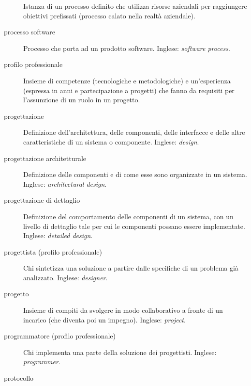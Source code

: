 \documentclass[a4paper]{article}
\begin{document}
\begin{description}
			Istanza di un processo definito che utilizza risorse aziendali per raggiungere obiettivi prefissati (processo calato nella realtà aziendale).
			
	\item[processo software] 

			Processo che porta ad un prodotto software. Inglese: \emph{software process}.
			
	\item[profilo professionale] 

			Insieme di competenze (tecnologiche e metodologiche) e un'esperienza (espressa in anni e partecipazione a progetti) che fanno da requisiti per l'assunzione di un ruolo in un progetto.
			
	\item[progettazione] 

			Definizione dell'architettura, delle componenti, delle interfacce e delle altre caratteristiche di un sistema o componente. Inglese: \emph{design}.
			
	\item[progettazione architetturale] 

			Definizione delle componenti e di come esse sono organizzate in un sistema. Inglese: \emph{architectural design}.
			
	\item[progettazione di dettaglio] 

			Definizione del comportamento delle componenti di un sistema, con un livello di dettaglio tale per cui le componenti possano essere implementate. Inglese: \emph{detailed design}.
			
	\item[progettista (profilo professionale)] 

			Chi sintetizza una soluzione a partire dalle specifiche di un problema già analizzato. Inglese: \emph{designer}.
			
	\item[progetto] 

			Insieme di compiti da svolgere in modo collaborativo a fronte di un incarico (che diventa poi un impegno). Inglese: \emph{project}.
			
	\item[programmatore (profilo professionale)] 

			Chi implementa una parte della soluzione dei progettisti. Inglese: \emph{programmer}.
			
	\item[protocollo] 


\end{description}
\end{document}
